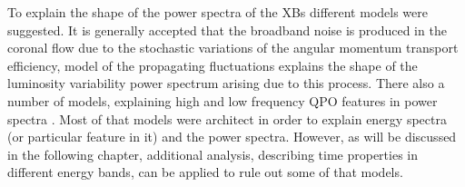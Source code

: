 \documentclass[a4paper,fleqn,usenatbib]{mnras}
\begin{document}
To explain the shape of the power spectra of the XBs different models were suggested. 
It is generally accepted that the broadband noise is produced in the coronal flow due to the stochastic variations of the angular momentum transport efficiency, \citep{lyubarskii97} model of the propagating fluctuations explains the shape of the luminosity variability power spectrum arising due to this process. 
There also a number of models, explaining high and low frequency QPO features in power spectra \citep[][]{ingram09, citesomething}. 
Most of that models were architect in order to explain energy spectra (or particular feature in it) and the power spectra. 
However, as will be discussed in the following chapter, additional analysis, describing time properties in different energy bands, can be applied to rule out some of that models.
\end{document}
